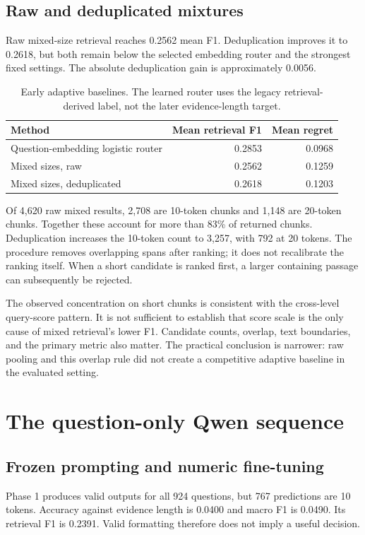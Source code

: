 \subsection{Raw and deduplicated mixtures}
Raw mixed-size retrieval reaches 0.2562 mean F1. Deduplication improves
it to 0.2618, but both remain below the selected embedding router
and the strongest fixed settings. The absolute deduplication gain
is approximately 0.0056.

\begin{table}[tbp]
\centering
\caption{Early adaptive baselines. The learned router uses the legacy
retrieval-derived label, not the later evidence-length target.}
\label{tab:early}
\begin{tabular}{@{}lrr@{}}
\toprule
Method & Mean retrieval F1 & Mean regret\\
\midrule
Question-embedding logistic router & 0.2853 & 0.0968\\
Mixed sizes, raw & 0.2562 & 0.1259\\
Mixed sizes, deduplicated & 0.2618 & 0.1203\\
\bottomrule
\end{tabular}
\end{table}

Of 4,620 raw mixed results, 2,708 are 10-token chunks and 1,148 are
20-token chunks. Together these account for more than 83\% of
returned chunks. Deduplication increases the 10-token count to
3,257, with 792 at 20 tokens. The procedure removes overlapping
spans after ranking; it does not recalibrate the ranking itself.
When a short candidate is ranked first, a larger containing passage
can subsequently be rejected.

The observed concentration on short chunks is consistent with the
cross-level query-score pattern. It is not sufficient to establish
that score scale is the only cause of mixed retrieval's lower F1.
Candidate counts, overlap, text boundaries, and the primary metric
also matter. The practical conclusion is narrower: raw pooling
and this overlap rule did not create a competitive adaptive baseline
in the evaluated setting.

\section{The question-only Qwen sequence}


\subsection{Frozen prompting and numeric fine-tuning}
Phase 1 produces valid outputs for all 924 questions, but 767 predictions
are 10 tokens. Accuracy against evidence length is 0.0400 and macro
F1 is 0.0490. Its retrieval F1 is 0.2391. Valid formatting therefore
does not imply a useful decision.

